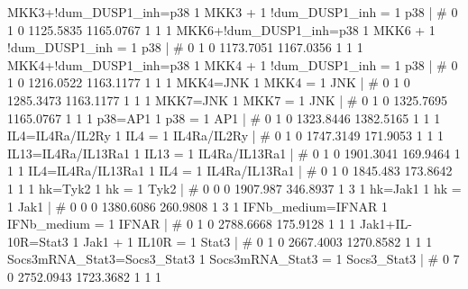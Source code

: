 MKK3+!dum_DUSP1_inh=p38                             	1 MKK3 + 1 !dum_DUSP1_inh = 1 p38 	| 	# 	0              1              0      1125.5835      1165.0767              1              1              1 
MKK6+!dum_DUSP1_inh=p38                             	1 MKK6 + 1 !dum_DUSP1_inh = 1 p38 	| 	# 	0              1              0      1173.7051      1167.0356              1              1              1 
MKK4+!dum_DUSP1_inh=p38                             	1 MKK4 + 1 !dum_DUSP1_inh = 1 p38 	| 	# 	0              1              0      1216.0522      1163.1177              1              1              1 
MKK4=JNK                                            	1 MKK4 = 1 JNK 	| 	# 	0              1              0      1285.3473      1163.1177              1              1              1 
MKK7=JNK                                            	1 MKK7 = 1 JNK 	| 	# 	0              1              0      1325.7695      1165.0767              1              1              1 
p38=AP1                                             	1 p38 = 1 AP1 	| 	# 	0              1              0      1323.8446      1382.5165              1              1              1 
IL4=IL4Ra/IL2Ry                                     	1 IL4 = 1 IL4Ra/IL2Ry 	| 	# 	0              1              0      1747.3149       171.9053              1              1              1 
IL13=IL4Ra/IL13Ra1                                  	1 IL13 = 1 IL4Ra/IL13Ra1 	| 	# 	0              1              0      1901.3041       169.9464              1              1              1 
IL4=IL4Ra/IL13Ra1                                   	1 IL4 = 1 IL4Ra/IL13Ra1 	| 	# 	0              1              0       1845.483       173.8642              1              1              1 
hk=Tyk2                                             	1 hk = 1 Tyk2 	| 	# 	0              0              0       1907.987       346.8937              1              3              1 
hk=Jak1                                             	1 hk = 1 Jak1 	| 	# 	0              0              0      1380.6086       260.9808              1              3              1 
IFNb_medium=IFNAR                                   	1 IFNb_medium = 1 IFNAR 	| 	# 	0              1              0      2788.6668       175.9128              1              1              1 
Jak1+IL-10R=Stat3                                   	1 Jak1 + 1 IL10R = 1 Stat3 	| 	# 	0              1              0      2667.4003      1270.8582              1              1              1 
Socs3mRNA_Stat3=Socs3_Stat3                         	1 Socs3mRNA_Stat3 = 1 Socs3_Stat3 	| 	# 	0              7              0      2752.0943      1723.3682              1              1              1 
